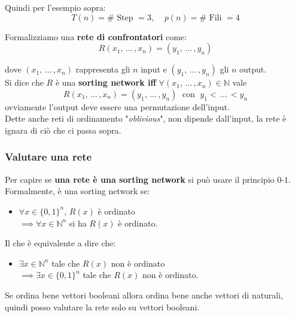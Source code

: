 	Quindi per l'esempio sopra:
	$$ T(n) = \# \text{ Step } = 3, \;\;\;\; p(n) = \# \text{ Fili } = 4 $$
	
	Formalizziamo una \textbf{rete di confrontatori} come: 
	$$ R (x_1, \, \dots \, , x_n) = (y_1, \, \dots \, , y_n) $$
	
	dove $(x_1, \, \dots \, , x_n)$ rappresenta gli $n$ input e $(y_1, \, \dots \, , y_n)$ gli $n$ output.\\
	
	Si dice che $R$ è una \textbf{sorting network iff} $\forall (x_1, \, \dots \, , x_n) \in \mathbb{N}$ vale 
	$$ R (x_1, \, \dots \, , x_n) = (y_1, \, \dots \, , y_n) \; \text{ con } \; y_1 < \, \dots \, < y_n $$
	ovviamente l'output deve essere una permutazione dell'input.\\
	
	Dette anche reti di ordinamento "\textit{oblivious}", non dipende dall'input, la rete è ignara di ciò che ci passa sopra.\\
	
	\newpage
	
	\subsubsection{Valutare una rete}
	
	Per capire se \textbf{una rete è una sorting network} si può usare il principio $0$-$1$.\\
	
	Formalmente, è una sorting network se: 
	\begin{itemize}
		\item $\forall x \in \{0,1\}^n$, $R(x)$ è ordinato\\
		$\implies \forall x \in \mathbb{N}^n$ si ha $R(x)$ è ordinato.\\
	\end{itemize}
	
	Il che è equivalente a dire che:
	\begin{itemize}
		\item $\exists x \in \mathbb{N}^n$ tale che $R(x)$ non è ordinato\\
		$\implies \exists x \in \{0,1\}^n$ tale che $R(x)$ non è ordinato.\\
	\end{itemize}
	
	Se ordina bene vettori booleani allora ordina bene anche vettori di naturali, quindi posso valutare la rete solo su vettori booleani.\\
	
